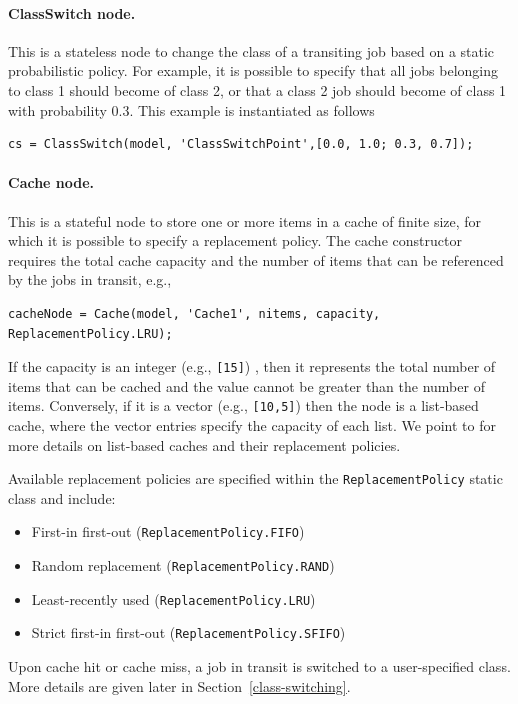 \paragraph{ClassSwitch node.} This is a stateless node to change the class of a transiting job based on a static probabilistic policy. For example, it is possible to specify that all jobs belonging to class 1 should become of class 2, or that a class 2 job should become of class 1 with probability $0.3$. This example is instantiated as follows
\begin{lstlisting}
cs = ClassSwitch(model, 'ClassSwitchPoint',[0.0, 1.0; 0.3, 0.7]);
\end{lstlisting}

\paragraph{Cache node.} This is a stateful node to store one or more items in a cache of finite size, for which it is possible to specify a replacement policy.  The cache constructor requires the total cache capacity and the number of items that can be referenced by the jobs in transit, e.g.,
\begin{lstlisting}
cacheNode = Cache(model, 'Cache1', nitems, capacity, ReplacementPolicy.LRU);
\end{lstlisting}
If the capacity is an integer (e.g., \texttt{[15]}) , then it represents the total number of items that can be cached and the value cannot be greater than the number of items. Conversely, if it is a vector (e.g., \texttt{[10,5]}) then the node is a list-based cache, where the vector entries specify the capacity of each list. We point to \cite{GastH16} for more details on list-based caches and their replacement policies.

Available replacement policies are specified within the \texttt{ReplacementPolicy} static class and include:
\begin{itemize}
\item First-in first-out (\texttt{ReplacementPolicy.FIFO})
\item Random replacement (\texttt{ReplacementPolicy.RAND})
\item Least-recently used (\texttt{ReplacementPolicy.LRU})
\item Strict first-in first-out (\texttt{ReplacementPolicy.SFIFO})
\end{itemize}
Upon cache hit or cache miss, a job in transit is switched to a user-specified class. More details are given later in Section~\ref{class-switching}.

